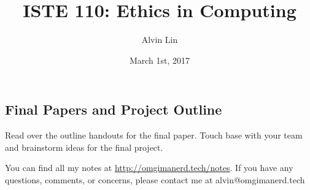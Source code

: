 \documentclass[letterpaper, 12pt]{article}
\title{ISTE 110: Ethics in Computing}
\author{Alvin Lin}
\date{March 1st, 2017}
\begin{document}
\maketitle

\subsection*{Final Papers and Project Outline}
Read over the outline handouts for the final paper.
Touch base with your team and brainstorm ideas for the final project.

\begin{center}
  You can find all my notes at \url{http://omgimanerd.tech/notes}. If you have
  any questions, comments, or concerns, please contact me at
  alvin@omgimanerd.tech
\end{center}
\end{document}
